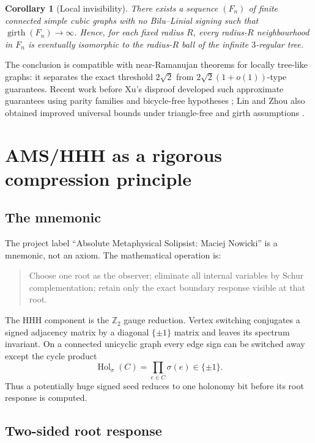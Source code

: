 \documentclass[11pt]{article}
\newtheorem{corollary}[theorem]{Corollary}
\newcommand{\sgn}{\sigma}
\begin{document}
\begin{corollary}[Local invisibility]\label{cor:local}
There exists a sequence $(F_n)$ of finite connected simple cubic graphs with no Bilu--Linial signing such that $\operatorname{girth}(F_n)\to\infty$.  Hence, for each fixed radius $R$, every radius-$R$ neighbourhood in $F_n$ is eventually isomorphic to the radius-$R$ ball of the infinite $3$-regular tree.
\end{corollary}

The conclusion is compatible with near-Ramanujan theorems for locally tree-like graphs: it separates the exact threshold $2\sqrt2$ from $2\sqrt2(1+o(1))$-type guarantees.  Recent work before Xu's disproof developed such approximate guarantees using parity families and bicycle-free hypotheses \cite{Suvagiya2026}; Lin and Zhou also obtained improved universal bounds under triangle-free and girth assumptions \cite{LinZhou2026}.

\section{AMS/HHH as a rigorous compression principle}

\subsection{The mnemonic}

The project label ``Absolute Metaphysical Solipsist: Maciej Nowicki'' is a mnemonic, not an axiom.  The mathematical operation is:

\begin{quote}
Choose one root as the observer; eliminate all internal variables by Schur complementation; retain only the exact boundary response visible at that root.
\end{quote}

The HHH component is the $\mathbb Z_2$ gauge reduction.  Vertex switching conjugates a signed adjacency matrix by a diagonal $\{\pm1\}$ matrix and leaves its spectrum invariant.  On a connected unicyclic graph every edge sign can be switched away except the cycle product
\[
 \operatorname{Hol}_\sgn(C)=\prod_{e\in C}\sgn(e)\in\{\pm1\}.
\]
Thus a potentially huge signed seed reduces to one holonomy bit before its root response is computed.

\subsection{Two-sided root response}
\end{document}
